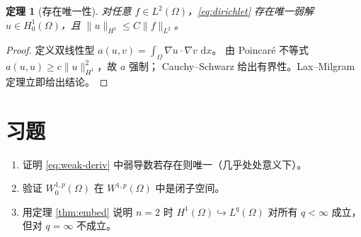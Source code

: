 \documentclass[11pt,a4paper,UTF8,fontset=fandol]{ctexart}
\newtheorem{theorem}{定理}[section]
\theoremstyle{definition}
\theoremstyle{remark}
\newcommand{\Om}{\Omega}
\newcommand{\Lp}[1]{L^{#1}}
\newcommand{\Hs}[1]{H^{#1}}
\newcommand{\dd}{\,\mathrm{d}}
\begin{document}
\begin{theorem}[存在唯一性]
对任意 $f\in\Lp2(\Om)$，\eqref{eq:dirichlet} 存在唯一弱解
$u\in\Hs1_0(\Om)$，且 $\|u\|_{\Hs1}\le C\|f\|_{\Lp2}$。
\end{theorem}

\begin{proof}
定义双线性型 $a(u,v)=\int_{\Om}\nabla u\cdot\nabla v\,\dd x$。
由 Poincaré 不等式 $a(u,u)\ge c\|u\|_{\Hs1}^2$，故 $a$ 强制；
Cauchy--Schwarz 给出有界性。Lax--Milgram 定理立即给出结论。
\end{proof}

\section*{习题}
\begin{enumerate}
  \item 证明 \eqref{eq:weak-deriv} 中弱导数若存在则唯一（几乎处处意义下）。
  \item 验证 $W^{1,p}_0(\Om)$ 在 $W^{1,p}(\Om)$ 中是闭子空间。
  \item 用定理 \ref{thm:embed} 说明 $n=2$ 时 $\Hs1(\Om)\hookrightarrow\Lp q(\Om)$
        对所有 $q<\infty$ 成立，但对 $q=\infty$ 不成立。
\end{enumerate}
\end{document}
